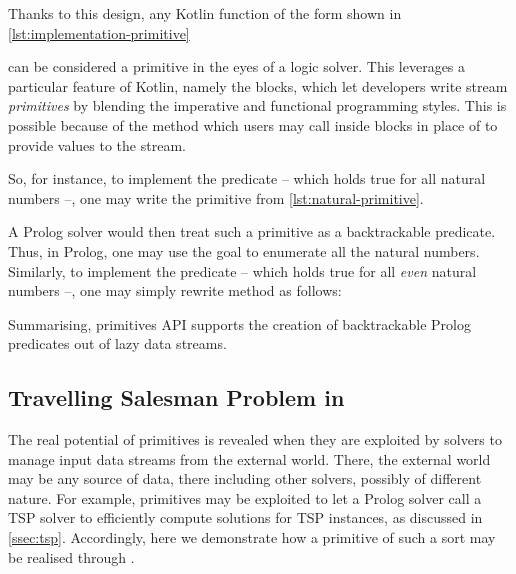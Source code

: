 \documentclass[12pt,a4paper,openright,twoside]{book}
\begin{document}
Thanks to this design, any Kotlin function of the form shown in \cref{lst:implementation-primitive}
%

%
can be considered a primitive in the eyes of a logic solver.
%
This leverages a particular feature of Kotlin, namely the  blocks, which let developers write stream \emph{primitives} by blending the imperative and functional programming styles.
%
This is possible because of the  method which users may call inside  blocks in place of  to provide values to the stream.

So, for instance, to implement the predicate  -- which holds true for all natural numbers --, one may write the primitive from \cref{lst:natural-primitive}.
%

%
A Prolog solver would then treat such a primitive as a backtrackable predicate.
%
Thus, in Prolog, one may use the goal  to enumerate all the natural numbers.
%
Similarly, to implement the predicate  -- which holds true for all \emph{even} natural numbers --, one may simply rewrite method  as follows:
%


Summarising, \twopkt{} primitives API supports the creation of backtrackable Prolog predicates out of lazy data streams.

\subsection{Travelling Salesman Problem in \twopkt{}}

The real potential of primitives is revealed when they are exploited by solvers to manage input data streams from the external world.
%
There, the external world may be any source of data, there including other solvers, possibly of different nature.
%
For example, primitives may be exploited to let a Prolog solver call a TSP solver to efficiently compute solutions for TSP instances, as discussed in \cref{ssec:tsp}.
%
Accordingly, here we demonstrate how a primitive of such a sort may be realised through \twopkt{}.
\end{document}
